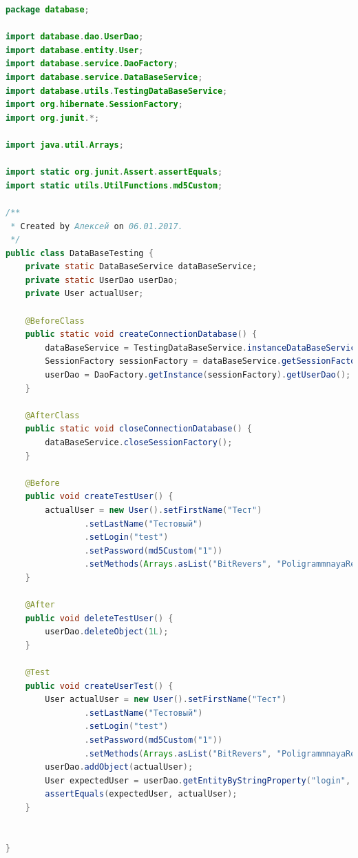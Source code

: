 \documentclass[a4paper,12pt]{article}
\begin{document}
\begin{lstlisting}[language=java, caption=код модуля DataBaseTesting.java]
package database;

import database.dao.UserDao;
import database.entity.User;
import database.service.DaoFactory;
import database.service.DataBaseService;
import database.utils.TestingDataBaseService;
import org.hibernate.SessionFactory;
import org.junit.*;

import java.util.Arrays;

import static org.junit.Assert.assertEquals;
import static utils.UtilFunctions.md5Custom;

/**
 * Created by Алексей on 06.01.2017.
 */
public class DataBaseTesting {
    private static DataBaseService dataBaseService;
    private static UserDao userDao;
    private User actualUser;

    @BeforeClass
    public static void createConnectionDatabase() {
        dataBaseService = TestingDataBaseService.instanceDataBaseService();
        SessionFactory sessionFactory = dataBaseService.getSessionFactory();
        userDao = DaoFactory.getInstance(sessionFactory).getUserDao();
    }

    @AfterClass
    public static void closeConnectionDatabase() {
        dataBaseService.closeSessionFactory();
    }

    @Before
    public void createTestUser() {
        actualUser = new User().setFirstName("Тест")
                .setLastName("Тестовый")
                .setLogin("test")
                .setPassword(md5Custom("1"))
                .setMethods(Arrays.asList("BitRevers", "PoligrammnayaReplacement"));
    }

    @After
    public void deleteTestUser() {
        userDao.deleteObject(1L);
    }

    @Test
    public void createUserTest() {
        User actualUser = new User().setFirstName("Тест")
                .setLastName("Тестовый")
                .setLogin("test")
                .setPassword(md5Custom("1"))
                .setMethods(Arrays.asList("BitRevers", "PoligrammnayaReplacement"));
        userDao.addObject(actualUser);
        User expectedUser = userDao.getEntityByStringProperty("login", "test");
        assertEquals(expectedUser, actualUser);
    }


}
\end{lstlisting}
\end{document}
